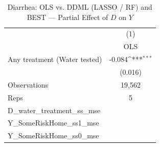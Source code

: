 \begin{table}[htbp]\centering
\def\sym#1{\ifmmode^{#1}\else\(^{#1}\)\fi}
\caption{Diarrhea: OLS vs. DDML (LASSO / RF) and BEST — Partial Effect of $D$ on $Y$}
\begin{tabular}{l*{1}{c}}
\toprule
                &\multicolumn{1}{c}{(1)}\\
                &\multicolumn{1}{c}{OLS}\\
\midrule
Any treatment (Water tested)&   -0.084\sym{***}\\
                &  (0.016)         \\
\midrule
Observations    &   19,562         \\
Reps            &        5         \\
D\_water\_treatment\_ss\_mse&                  \\
Y\_SomeRiskHome\_ss1\_mse&                  \\
Y\_SomeRiskHome\_ss0\_mse&                  \\
\bottomrule
\end{tabular}
\end{table}
